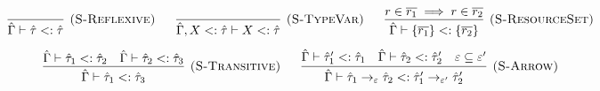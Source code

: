 \documentclass{llncs}
\begin{document}
\[
\begin{array}{c}


\infer[\textsc{(S-Reflexive)}]
	{\hat \Gamma \vdash \hat \tau <: \hat \tau}
	{}
~~~~~
\infer[\textsc{(S-TypeVar)}]
	{\hat \Gamma, X <: \hat \tau \vdash X <: \hat \tau}
	{}                                                                                                                                                                                                                                                                                                                                                                                                                                                                                                                                                                                                                                                                                                                                                                                                                                                                                                                                                                                                                                                                                                                                                                                                                                                                                                                                                                                                                                                                                                                                                                                                                                                                                                                    
~~~~~
\infer[\textsc{(S-ResourceSet)}]
	{\hat \Gamma \vdash \{ \overline{r_1} \} <: \{ \overline{r_2} \}}
	{r \in \overline{r_1} \implies r \in \overline{r_2}}\\[2ex]

\infer[\textsc{(S-Transitive)}]
	{\hat \Gamma \vdash \hat \tau_1 <: \hat \tau_3}
	{\hat \Gamma \vdash \hat \tau_1 <: \hat \tau_2 & \hat \Gamma \vdash \hat \tau_2 <: \hat \tau_3} 
~~~~~
\infer[\textsc{(S-Arrow)}]
	{\hat \Gamma \vdash \hat \tau_1 \rightarrow_{\varepsilon} \hat \tau_2 <: \hat \tau_1' \rightarrow_{\varepsilon'} \hat \tau_2'}
	{\hat \Gamma \vdash \hat \tau_1' <: \hat \tau_1 & \hat \Gamma \vdash \hat \tau_2 <: \hat \tau_2' & \varepsilon \subseteq \varepsilon'} \\[3ex]


\end{array}\]
\end{document}
